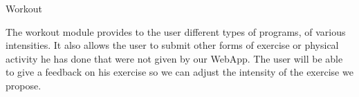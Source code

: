 \documentclass[conference]{IEEEtran}
\begin{document}
\begin{flushleft}
    \br
    Workout
\end{flushleft}
The workout module provides to the user different types of programs, of various intensities. It also allows the user to submit other forms of exercise or physical activity he has done that were not given by our WebApp. The user will be able to give a feedback on his exercise so we can adjust the intensity of the exercise we propose.
\end{document}
